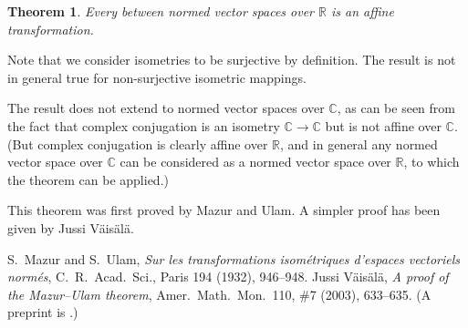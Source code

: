 \documentclass[12pt]{article}
\newtheorem*{thm*}{Theorem}
\def\C{\mathbb{C}}
\def\R{\mathbb{R}}
\begin{document}

\begin{thm*}
Every  between normed vector spaces over $\R$
is an affine transformation.
\end{thm*}

Note that we consider isometries to be surjective by definition.
The result is not in general true for non-surjective isometric mappings.

The result does not extend to normed vector spaces over $\C$,
as can be seen from the fact that complex conjugation is an isometry $\C\to\C$
but is not affine over $\C$.
(But complex conjugation is clearly affine over $\R$,
and in general any normed vector space over $\C$
can be considered as a normed vector space over $\R$,
to which the theorem can be applied.)

This theorem was first proved by Mazur and Ulam.\cite{mazurulam}
A simpler proof has been given by Jussi V\"{a}is\"{a}l\"{a}.\cite{vaisala}

\begin{thebibliography}{9}
 S.\ Mazur and S.\ Ulam,
 {\it Sur les transformations isom\'etriques d'espaces vectoriels norm\'es},
 C.\ R.\ Acad.\ Sci., Paris 194 (1932), 946--948.
 Jussi V\"{a}is\"{a}l\"{a},
 {\it A proof of the Mazur--Ulam theorem},
 Amer.\ Math.\ Mon.\ 110, \#7 (2003), 633--635.
 (A preprint is .)
\end{thebibliography}

\end{document}
